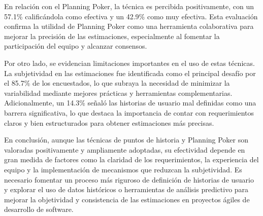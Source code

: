En relación con el Planning Poker, la técnica es percibida positivamente, con un 57.1\% calificándola como efectiva y un 42.9\% como muy efectiva. Esta evaluación confirma la utilidad de Planning Poker como una herramienta colaborativa para mejorar la precisión de las estimaciones, especialmente al fomentar la participación del equipo y alcanzar consensos.

Por otro lado, se evidencian limitaciones importantes en el uso de estas técnicas. La subjetividad en las estimaciones fue identificada como el principal desafío por el 85.7\% de los encuestados, lo que subraya la necesidad de minimizar la variabilidad mediante mejores prácticas y herramientas complementarias. Adicionalmente, un 14.3\% señaló las historias de usuario mal definidas como una barrera significativa, lo que destaca la importancia de contar con requerimientos claros y bien estructurados para obtener estimaciones más precisas.

En conclusión, aunque las técnicas de puntos de historia y Planning Poker son valoradas positivamente y ampliamente adoptadas, su efectividad depende en gran medida de factores como la claridad de los requerimientos, la experiencia del equipo y la implementación de mecanismos que reduzcan la subjetividad. Es necesario fomentar un proceso más riguroso de definición de historias de usuario y explorar el uso de datos históricos o herramientas de análisis predictivo para mejorar la objetividad y consistencia de las estimaciones en proyectos ágiles de desarrollo de software.